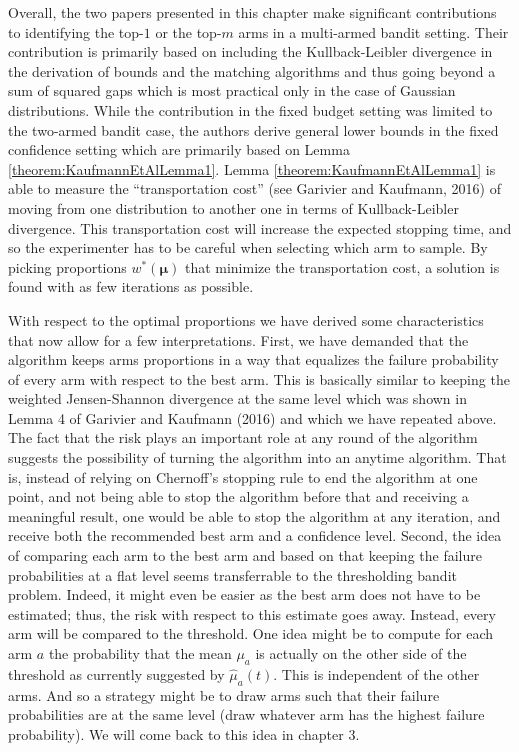 \documentclass[11pt,]{article}
\begin{document}
Overall, the two papers presented in this chapter make significant
contributions to identifying the top-\(1\) or the top-\(m\) arms in a
multi-armed bandit setting. Their contribution is primarily based on
including the Kullback-Leibler divergence in the derivation of bounds
and the matching algorithms and thus going beyond a sum of squared gaps
which is most practical only in the case of Gaussian distributions.
While the contribution in the fixed budget setting was limited to the
two-armed bandit case, the authors derive general lower bounds in the
fixed confidence setting which are primarily based on Lemma
\ref{theorem:KaufmannEtAlLemma1}. Lemma \ref{theorem:KaufmannEtAlLemma1}
is able to measure the ``transportation cost'' (see Garivier and
Kaufmann, 2016) of moving from one distribution to another one in terms
of Kullback-Leibler divergence. This transportation cost will increase
the expected stopping time, and so the experimenter has to be careful
when selecting which arm to sample. By picking proportions
\(w^*(\bm{\mu})\) that minimize the transportation cost, a solution is
found with as few iterations as possible.

With respect to the optimal proportions we have derived some
characteristics that now allow for a few interpretations. First, we have
demanded that the algorithm keeps arms proportions in a way that
equalizes the failure probability of every arm with respect to the best
arm. This is basically similar to keeping the weighted Jensen-Shannon
divergence at the same level which was shown in Lemma 4 of Garivier and
Kaufmann (2016) and which we have repeated above. The fact that the risk
plays an important role at any round of the algorithm suggests the
possibility of turning the algorithm into an anytime algorithm. That is,
instead of relying on Chernoff's stopping rule to end the algorithm at
one point, and not being able to stop the algorithm before that and
receiving a meaningful result, one would be able to stop the algorithm
at any iteration, and receive both the recommended best arm and a
confidence level. Second, the idea of comparing each arm to the best arm
and based on that keeping the failure probabilities at a flat level
seems transferrable to the thresholding bandit problem. Indeed, it might
even be easier as the best arm does not have to be estimated; thus, the
risk with respect to this estimate goes away. Instead, every arm will be
compared to the threshold. One idea might be to compute for each arm
\(a\) the probability that the mean \(\mu_a\) is actually on the other
side of the threshold as currently suggested by \(\hat{\mu}_a(t)\). This
is independent of the other arms. And so a strategy might be to draw
arms such that their failure probabilities are at the same level (draw
whatever arm has the highest failure probability). We will come back to
this idea in chapter 3.
\end{document}

